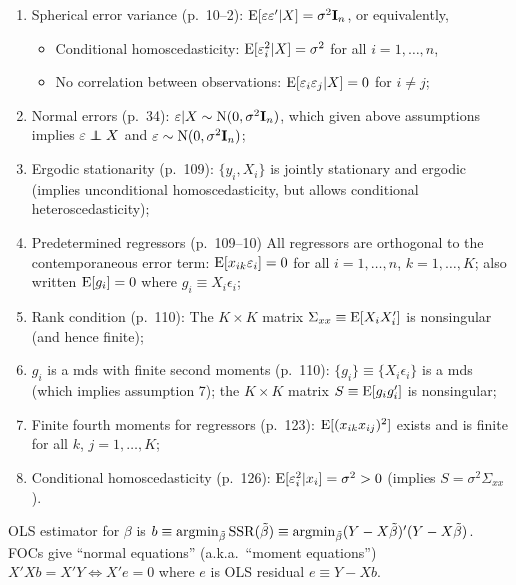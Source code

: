 \documentclass[8pt,letterpaper, landscape]{extarticle} %
\newcommand{\mI}{\ensuremath{\mathbf{I}}}
\begin{document}
\begin{multicols}{3}
\begin{description}
\begin{enumerate}
\item Spherical error variance (p.~10--2): $ \E [\epsilon \epsilon' | X] = \sigma^2 \mI_n $, or equivalently,
\begin{itemize}
\item Conditional homoscedasticity: $ \operatorname{E} [\varepsilon_i^2 | X] = \sigma^2 $ for all $ i=1, \dotsc , n $,
\item No correlation between observations: $ \operatorname{E} [\varepsilon_i \varepsilon_j | X] = 0 $ for $ i \neq j $;
\end{itemize}
\item Normal errors (p.~34): $ \epsilon | X \sim \n (0, \sigma^2 \mI_n) $, which given above assumptions implies $ \epsilon \independent X $ and $ \epsilon \sim \n (0, \sigma^2 \mI_n) $;
\item Ergodic stationarity (p.~109): $ \{ y_i , X_i \} $ is jointly stationary and ergodic (implies unconditional homoscedasticity, but allows conditional heteroscedasticity);
\item Predetermined regressors (p.~109--10) All regressors are orthogonal to the contemporaneous error term: $ \operatorname{E} [x_{ik} \varepsilon_i] = 0 $ for all $ i = 1, \dotsc , n $, $ k = 1, \dotsc , K $; also written $ \operatorname{E} [g_i] = 0 $ where $ g_i \equiv X_i \epsilon_i $;
\item Rank condition (p.~110): The $ K \times K $ matrix $ \Sigma_{xx} \equiv \operatorname{E} [X_i X_{i}' ] $ is nonsingular (and hence finite);
\item $ g_i $ is a mds with finite second moments (p.~110): $ \{ g_i \} \equiv \{ X_i \epsilon_i \}  $ is a mds (which implies assumption 7); the $ K \times K $ matrix $ S \equiv \operatorname{E} [g_i g_{i}' ] $ is nonsingular;
\item Finite fourth moments for regressors (p.~123): $ \operatorname{E} [(x_{ik} x_{ij})^{2}] $ exists and is finite for all $ k $, $ j = 1, \dotsc , K $;
\item Conditional homoscedasticity (p.~126): $ \operatorname{E} [\varepsilon_{i}^{2} | x_i ] = \sigma^{2} > 0 $ (implies $ S = \sigma^2 \Sigma_{xx} $).
\end{enumerate}

OLS estimator for $ \beta $ is $ b \equiv \operatorname*{argmin}_{\tilde{\beta}} \operatorname{SSR} (\tilde{\beta}) \equiv \operatorname*{argmin}_{\tilde{\beta}} (Y - X \tilde{\beta})' (Y - X \tilde{\beta}) $. FOCs give ``normal equations'' (a.k.a.\ ``moment equations'') $ X' X b = X' Y \iff X'e = 0 $ where $ e $ is OLS residual $ e \equiv Y - X b $.


\end{description}
\end{multicols}
\end{document}
